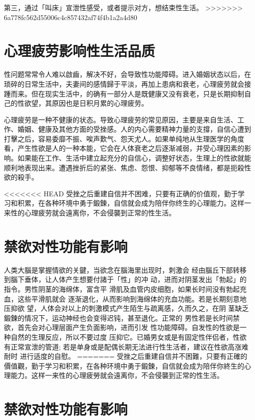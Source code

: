 \documentclass[12pt,UTF8]{ctexbook}
\begin{document}
第三，通过「叫床」宣泄性感受，或者提示对方，想结束性生活。
>>>>>>> 6a778fc562d55006c4c857432af74f4b1a2a4d80

\section{心理疲劳影响性生活品质}

性问题常常令人难以啟齒，解决不好，会导致性功能障碍。进入婚姻状态以后，在琐碎的日常生活中，夫妻间的感情歸于平淡，再加上患病和衰老，心理疲劳就会接踵而来。但在现实生活中，的确有一部分人是既健康又没有衰老，只是长期抑制自己的性欲望，其原因也是日积月累的心理疲劳。

心理疲劳是一种不健康的状态。导致心理疲劳的常见原因，主要是来自生活、工作、婚姻、健康及其他方面的受挫感。人的内心需要精神力量的支撐，自信心遭到打擊之后，容易委靡不振、唉声歎气、怨天尤人。如果单纯地从生理医学的角度看，产生性欲是人的一种本能，它会在人体衰老之后逐渐减弱，并受心理因素的影响。如果能在工作、生活中建立起充分的自信心，调整好状态，生理上的性欲就能顺利地表现出来。遭遇挫折后的紧张、焦虑、怨恨、抑郁等不良情绪，都是扼殺性欲的殺手。

<<<<<<< HEAD
受挫之后重建自信并不困难，只要有正确的价值观，勤于学习和积累，在各种环境中勇于鍛鍊，自信就会成为陪伴你终生的心理能力。这样一来性的心理疲劳就会遠离你，不会侵襲到正常的性生活。

\section{禁欲对性功能有影响}

人类大腦是掌握情欲的关鍵，当欲念在腦海里出现时，刺激会
经由腦丘下部转移到腦下垂体，让人体产生想要付諸于「性」的冲
动，进而对阴茎发出「勃起」的指令。男性阴茎的海绵体，富含平
滑肌及血管内皮细胞，如果长时间没有勃起充血，这些平滑肌就会
逐渐退化，从而影响到海绵体的充血功能。若是长期刻意地压抑欲
望，人体会对以上的刺激模式产生陌生与疏离感，久而久之，在阴
茎缺乏鍛鍊的情况下，运动神经也会变得迟钝，甚至退化。正常的
男性若是长时间禁欲，首先会对心理层面产生负面影响，进而引发
性功能障碍。自发性的性欲是一种自然的生理反应，所以不要过度
压抑它。已婚男女或是有固定性伴侣者，性欲有正常宣泄的管道;
若是单身或是配偶长期无法进行性生活者，建议在性欲高涨难耐时
进行适度的自慰。
=======
受挫之后重建自信并不困難，只要有正確的價值觀，勤于学习和积累，在各种环境中勇于鍛鍊，自信就会成为陪伴你終生的心理能力。这样一来性的心理疲勞就会遠离你，不会侵襲到正常的性生活。

\section{禁欲对性功能有影响}
\end{document}
